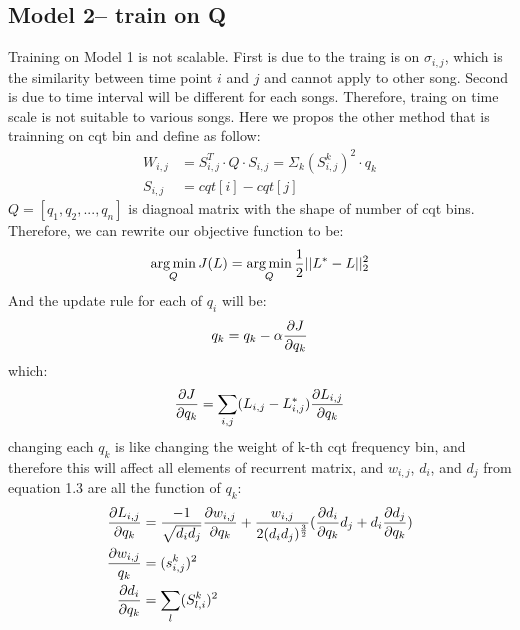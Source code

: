 \documentclass[final]{siamltexmm}
\DeclareMathOperator*{\argmin}{arg\,min} %
\begin{document}
\subsection{Model 2-- train on Q}
Training on Model 1 is not scalable. First is due to the traing is on $\sigma_{i,j}$, which is the similarity between time point $i$ and $j$ and cannot apply to other song. Second is due to time interval will be different for each songs. Therefore, traing on time scale is not suitable to various songs. Here we propos the other method that is trainning on cqt bin and define as follow:
\begin{equation}
\begin{aligned}
W_{i,j} &= S^T_{i,j} \cdot Q \cdot S_{i,j} = \Sigma_k (S^k_{i,j})^2 \cdot q_{k}\\
S_{i,j} &= cqt[i] - cqt[j]
\end{aligned}
\end{equation}
$Q = [q_1, q_2, ..., q_n]$ is diagnoal matrix with the shape of number of cqt bins. Therefore, we can rewrite our objective function to be:
\begin{equation}
\begin{aligned}
\argmin_Q J(L) = \argmin_Q {1\over 2}||L^{\ast} - L||^2_2
\end{aligned}
\end{equation}
And the update rule for each of $q_i$ will be:
\begin{equation}
\begin{aligned}
q_k = q_k - \alpha {\partial J \over \partial q_k}
\end{aligned}
\end{equation}
which:
\begin{equation}
\begin{aligned}
{\partial J \over \partial q_k} = \sum_{\substack{i,j}} (L_{i,j} - L_{i,j}^{\ast}) {\partial L_{i,j} \over \partial q_k}
\end{aligned}
\end{equation}
changing each $q_k$ is like changing the weight of k-th cqt frequency bin, and therefore this will affect all elements of recurrent matrix, and $w_{i,j}$, $d_i$, and $d_j$ from equation 1.3 are all the function of $q_k$:
\begin{equation}
\begin{aligned}
{\partial L_{i,j} \over \partial q_k} &= {-1 \over \sqrt{d_id_j}} {\partial w_{i,j}\over \partial q_k} + {w_{i,j} \over 2(d_id_j)^{3\over2}}({\partial d_i\over \partial q_k}d_j + d_i{\partial d_j\over \partial q_k})\\
{\partial w_{i,j} \over q_k} &= (s_{i,j}^k)^2 \\
{\partial d_i \over \partial q_k} &= \sum_{\substack{l}} (S_{l,i}^k)^2
\end{aligned}
\end{equation}
\end{document}
